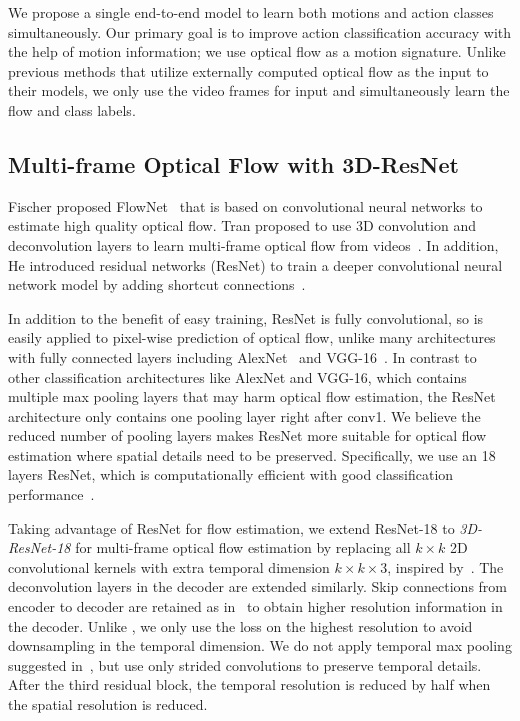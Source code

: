 \documentclass[10pt,twocolumn,letterpaper]{article}
\begin{document}
We propose a single end-to-end model to learn both motions and action classes simultaneously.
Our primary goal is to improve action classification accuracy with the help of motion information; we use optical flow as a motion signature.
Unlike previous methods that utilize externally computed optical flow as the input to their models, we only use the video frames for input and simultaneously learn the flow and class labels.

\subsection{Multi-frame Optical Flow with 3D-ResNet}%
Fischer \etal proposed FlowNet~\cite{FischerDIHHGSCB15} that is based on convolutional neural networks to estimate high quality optical flow. Tran \etal proposed to use 3D convolution and deconvolution layers to learn multi-frame optical flow from videos~\cite{tranbftp16}.
In addition, He \etal introduced residual networks (ResNet) to train a deeper convolutional neural network model by adding shortcut connections~\cite{heZRS15}.

In addition to the benefit of easy training, ResNet is fully convolutional, so is easily applied to pixel-wise prediction of optical flow, unlike many architectures with fully connected layers including AlexNet~\cite{krizhevskySH12} and VGG-16~\cite{simonyanZ14}.
In contrast to other classification architectures like AlexNet and VGG-16, which contains multiple max pooling layers that may harm optical flow estimation, the ResNet architecture only contains one pooling layer right after conv1.
We believe the reduced number of pooling layers makes ResNet more suitable for optical flow estimation where spatial details need to be preserved.
Specifically, we use an 18 layers ResNet, which is computationally efficient with good classification performance~\cite{heZRS15}.


Taking advantage of ResNet for flow estimation, we extend ResNet-18 to \emph{3D-ResNet-18} for multi-frame optical flow estimation by replacing all $k\times k$ 2D convolutional kernels with extra temporal dimension $k \times k \times 3$, inspired by~\cite{tranbftp16}.
The deconvolution layers in the decoder are extended similarly.
Skip connections from encoder to decoder are retained as in~\cite{FischerDIHHGSCB15} to obtain higher resolution information in the decoder.
Unlike \cite{FischerDIHHGSCB15}, we only use the loss on the highest resolution to avoid downsampling in the temporal dimension. We do not apply temporal max pooling suggested in~\cite{tranBFTP15,tranbftp16}, but use only strided convolutions to preserve temporal details. After the third residual block, the temporal resolution is reduced by half when the spatial resolution is reduced.
\end{document}
